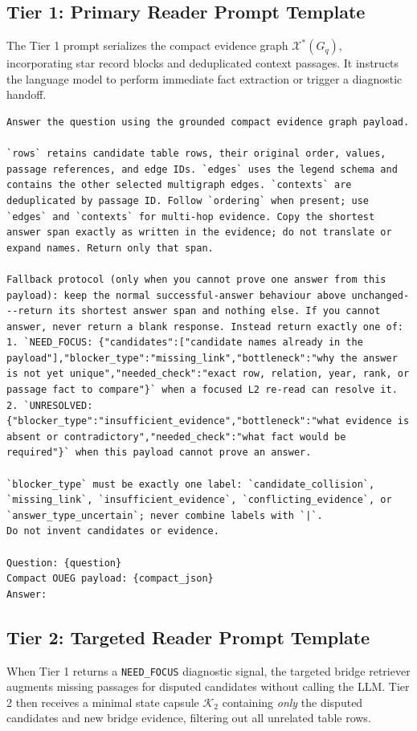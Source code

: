 \documentclass[runningheads]{llncs}
\begin{document}
\subsection{Tier 1: Primary Reader Prompt Template}
The Tier 1 prompt serializes the compact evidence graph $\mathcal{X}^*(G_q)$, incorporating star record blocks and deduplicated context passages. It instructs the language model to perform immediate fact extraction or trigger a diagnostic handoff.

\begin{lstlisting}[caption={Tier 1 Prompt Template (Primary Reader with Diagnostic Protocol)}]
Answer the question using the grounded compact evidence graph payload.

`rows` retains candidate table rows, their original order, values, passage references, and edge IDs. `edges` uses the legend schema and contains the other selected multigraph edges. `contexts` are deduplicated by passage ID. Follow `ordering` when present; use `edges` and `contexts` for multi-hop evidence. Copy the shortest answer span exactly as written in the evidence; do not translate or expand names. Return only that span.

Fallback protocol (only when you cannot prove one answer from this payload): keep the normal successful-answer behaviour above unchanged---return its shortest answer span and nothing else. If you cannot answer, never return a blank response. Instead return exactly one of:
1. `NEED_FOCUS: {"candidates":["candidate names already in the payload"],"blocker_type":"missing_link","bottleneck":"why the answer is not yet unique","needed_check":"exact row, relation, year, rank, or passage fact to compare"}` when a focused L2 re-read can resolve it.
2. `UNRESOLVED: {"blocker_type":"insufficient_evidence","bottleneck":"what evidence is absent or contradictory","needed_check":"what fact would be required"}` when this payload cannot prove an answer.

`blocker_type` must be exactly one label: `candidate_collision`, `missing_link`, `insufficient_evidence`, `conflicting_evidence`, or `answer_type_uncertain`; never combine labels with `|`.
Do not invent candidates or evidence.

Question: {question}
Compact OUEG payload: {compact_json}
Answer:
\end{lstlisting}

\subsection{Tier 2: Targeted Reader Prompt Template}
When Tier 1 returns a \texttt{NEED\_FOCUS} diagnostic signal, the targeted bridge retriever augments missing passages for disputed candidates without calling the LLM. Tier 2 then receives a minimal state capsule $\mathcal{K}_2$ containing \emph{only} the disputed candidates and new bridge evidence, filtering out all unrelated table rows.
\end{document}
